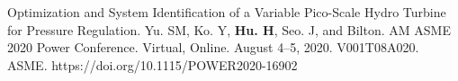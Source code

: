 


\begin{cventries}
  \cvpublicationentrysimple
    {Optimization and System Identification of a Variable Pico-Scale Hydro Turbine for Pressure Regulation.} %
    {Yu. SM, Ko. Y, \textbf{Hu. H}, Seo. J, and Bilton. AM} %
    {ASME 2020 Power Conference. Virtual, Online. August 4–5, 2020. V001T08A020. ASME. https://doi.org/10.1115/POWER2020-16902}
\end{cventries}










